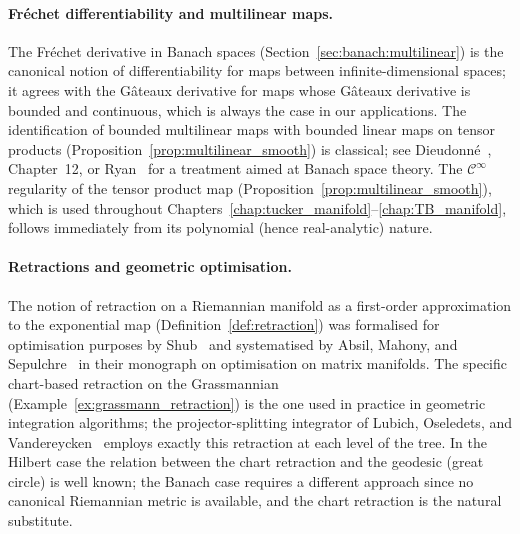 \paragraph{Fréchet differentiability and multilinear maps.}
The Fréchet derivative in Banach spaces
(Section~\ref{sec:banach:multilinear}) is the canonical notion of
differentiability for maps between infinite-dimensional spaces; it agrees
with the Gâteaux derivative for maps whose Gâteaux derivative is bounded
and continuous, which is always the case in our applications. The
identification of bounded multilinear maps with bounded linear maps on
tensor products
(Proposition~\ref{prop:multilinear_smooth})
is classical; see Dieudonné~\cite{Dieudonne1972}, Chapter~12, or
Ryan~\cite{Ryan2002} for a treatment aimed at Banach space theory.
The $\mathcal{C}^\infty$ regularity of the tensor product map
(Proposition~\ref{prop:multilinear_smooth}), which is used throughout
Chapters~\ref{chap:tucker_manifold}--\ref{chap:TB_manifold}, follows
immediately from its polynomial (hence real-analytic) nature.

\paragraph{Retractions and geometric optimisation.}
The notion of retraction on a Riemannian manifold as a first-order
approximation to the exponential map
(Definition~\ref{def:retraction}) was formalised for optimisation
purposes by Shub~\cite{Shub1986} and systematised by Absil, Mahony, and
Sepulchre~\cite{AbsilMahonySepulchre2008} in their monograph on
optimisation on matrix manifolds. The specific chart-based retraction on
the Grassmannian (Example~\ref{ex:grassmann_retraction}) is the one
used in practice in geometric integration algorithms; the
projector-splitting integrator of Lubich, Oseledets, and
Vandereycken~\cite{LubichOseledetsVandereycken2015} employs exactly
this retraction at each level of the tree. In the Hilbert case the
relation between the chart retraction and the geodesic (great circle) is
well known; the Banach case requires a different approach since no
canonical Riemannian metric is available, and the chart retraction is
the natural substitute.
